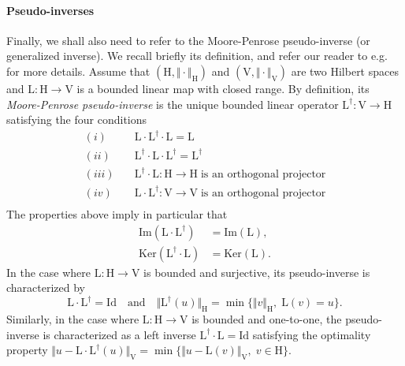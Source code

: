 \documentclass[a4paper,11pt]{article}
\newcommand{\mrm}{\mathrm}
\newcommand{\mL}{\mathrm{L}}
\newcommand{\mH}{\mathrm{H}}
\newcommand{\mV}{\mathrm{V}}
\newcommand{\Id}{\mathrm{Id}}
\begin{document}
\paragraph{Pseudo-inverses} Finally, we shall also need to refer to the Moore-Penrose pseudo-inverse
(or generalized inverse). We recall briefly its definition, and refer
our reader to e.g.~\cite{MR1987382,OriginalMooreRef,MR69793} for more
details. Assume that $(\mH,\Vert\cdot\Vert_{\mH})$ and
$(\mV,\Vert\cdot\Vert_{\mV})$ are two Hilbert spaces and $\mL\colon
\mH\to \mV$ is a bounded linear map with closed range. By definition,
its \emph{Moore-Penrose pseudo-inverse} is the unique bounded linear
operator $\mL^{\dagger}\colon\mV\to \mH$ satisfying the four
conditions
\begin{equation}\label{MoorePenroseProperties}
  \begin{aligned}
    (i) \quad & \mL\cdot\mL^{\dagger}\cdot\mL =\mL\\
    (ii) \quad & \mL^{\dagger}\cdot\mL\cdot\mL^{\dagger} =\mL^{\dagger}\\
    (iii) \quad & \mL^{\dagger}\cdot\mL\colon \mH\to \mH\;\text{is an orthogonal projector}\\
    (iv) \quad & \mL\cdot\mL^{\dagger}\colon \mV\to \mV\;\text{is an orthogonal projector}\\
  \end{aligned}
\end{equation}
The properties above imply in particular that
\begin{subequations}\label{MoorePenroseConsequences}
  \begin{align}
    \mrm{Im}(\mL\cdot\mL^{\dagger}) &= \mrm{Im}(\mL), \label{MoorePenroseRange}\\
    \mrm{Ker}(\mL^{\dagger}\cdot\mL) &= \mrm{Ker}(\mL). \label{MoorePenroseKernel}
  \end{align}
\end{subequations}
In the case where
$\mL\colon\mH\to \mV$ is bounded and surjective, its pseudo-inverse is
characterized by
\begin{equation}\label{CaracPseudoInverse}
  \mL\cdot\mL^{\dagger} = \Id\quad
  \text{and}\quad
  \Vert \mL^{\dagger}(u)\Vert_{\mH} = \min\{\Vert v\Vert_{\mH},\; \mL(v) = u\}.
\end{equation}
Similarly, in the case where $\mL\colon\mH\to \mV$ is bounded and
one-to-one, the pseudo-inverse is characterized as a left inverse
$\mL^{\dagger}\cdot\mL = \Id$ satisfying the optimality property
$\Vert u-\mL\cdot\mL^{\dagger}(u)\Vert_{\mV} = \min\{\Vert
u-\mL(v)\Vert_{\mV},\;v\in \mH\}$.
\end{document}
